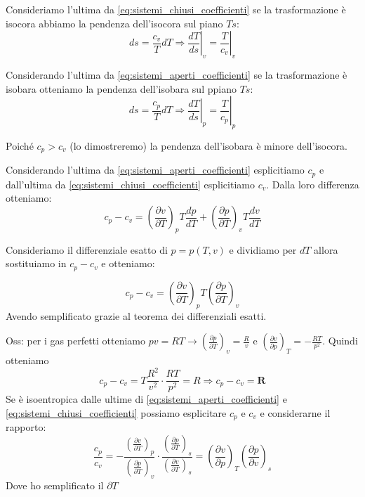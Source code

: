 \documentclass[a4paper]{article}
\numberwithin{equation}{section}%
\begin{document}
 Consideriamo l'ultima da \eqref{eq:sistemi_chiusi_coefficienti} se la trasformazione è isocora abbiamo la pendenza dell'isocora sul piano $Ts$:
 \begin{equation}
d s=\left.\frac{c_{v}}{T} d T \Rightarrow \frac{d T}{d s}\right|_{v}=\left.\frac{T}{c_{v}}\right|_{v}
 \end{equation}

Considerando  l'ultima da \eqref{eq:sistemi_aperti_coefficienti} se la trasformazione è isobara otteniamo la pendenza dell'isobara sul ppiano $Ts$:
\begin{equation}
d s=\left.\frac{c_{p}}{T} d T \Rightarrow \frac{d T}{d s}\right|_{p}=\left.\frac{T}{c_{p}}\right|_{p}
\end{equation}

Poiché $c_p>c_v$ (lo dimostreremo) la pendenza dell'isobara è minore dell'isocora.

Considerando  l'ultima da \eqref{eq:sistemi_aperti_coefficienti} esplicitiamo $c_p$ e dall'ultima da \eqref{eq:sistemi_chiusi_coefficienti} esplicitiamo $c_v$. Dalla loro differenza otteniamo: 
\begin{equation}
	c_{p}-c_{v}=\left(\frac{\partial v}{\partial T}\right)_{p} T \frac{d p}{d T}+\left(\frac{\partial p}{\partial T}\right)_{v} T \frac{d v}{d T}
\end{equation}

Consideriamo il differenziale esatto di $p=p(T,v)$ e dividiamo per $dT$ allora sostituiamo in $c_p-c_v$ e otteniamo:

\begin{equation}
	c_{p}-c_{v}=\left(\frac{\partial v}{\partial T}\right)_{p} T\left(\frac{\partial p}{\partial T}\right)_{v}
\end{equation}
Avendo semplificato grazie al teorema dei differenziali esatti.
\newline

Oss: per i gas perfetti otteniamo $p v=R T \rightarrow\left(\frac{\partial p}{\partial T}\right)_{v}=\frac{R}{v}$ e $\left(\frac{\partial v}{\partial p}\right)_{T}=-\frac{R T}{p^{2}}$.
Quindi otteniamo \begin{equation}
	c_{p}-c_{v}=T \frac{R^{2}}{v^{2}} \cdot \frac{R T}{p^{2}}=R \Rightarrow {c}_{{p}}-{c}_{v}=\boldsymbol{R}
\end{equation}
\newline
Se è isoentropica dalle ultime di  \eqref{eq:sistemi_aperti_coefficienti} e  \eqref{eq:sistemi_chiusi_coefficienti} possiamo esplicitare $c_p$ e $c_v$ e considerarne il rapporto: \begin{equation}
\frac{c_{p}}{c_{v}}=-\frac{\left(\frac{\partial v}{\partial T}\right)_{p}}{\left(\frac{\partial p}{\partial T}\right)_{v}} \cdot \frac{\left(\frac{\partial p}{\partial T}\right)_{s}}{\left(\frac{\partial v}{\partial T}\right)_{s}}=\left(\frac{\partial v}{\partial p}\right)_{T}\left(\frac{\partial p}{\partial v}\right)_{s}
\end{equation}
Dove ho semplificato il $\partial T$
\end{document}
